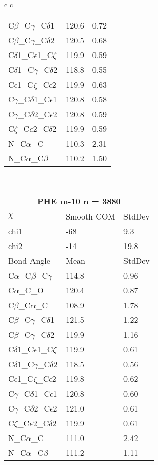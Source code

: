 \begin{longtable}{ c c }
\begin{tabular}{ l l l }
  C$\beta$\_C$\gamma$\_C$\delta$1 & 120.6 & 0.72\\
  C$\beta$\_C$\gamma$\_C$\delta$2 & 120.5 & 0.68\\
  C$\delta$1\_C$\epsilon$1\_C$\zeta$ & 119.9 & 0.59\\
  C$\delta$1\_C$\gamma$\_C$\delta$2 & 118.8 & 0.55\\
  C$\epsilon$1\_C$\zeta$\_C$\epsilon$2 & 119.9 & 0.63\\
  C$\gamma$\_C$\delta$1\_C$\epsilon$1 & 120.8 & 0.58\\
  C$\gamma$\_C$\delta$2\_C$\epsilon$2 & 120.8 & 0.59\\
  C$\zeta$\_C$\epsilon$2\_C$\delta$2 & 119.9 & 0.59\\
  N\_C$\alpha$\_C & 110.3 & 2.31\\
  N\_C$\alpha$\_C$\beta$ & 110.2 & 1.50\\
  \bottomrule
  \end{tabular}
  \\
  \begin{tabular}{ l l l }
  \toprule
  \multicolumn{3}{c}{PHE \textbf{m-10} n = 3880} \\ \toprule
  $\chi$       & Smooth COM & StdDev \\ \midrule
  chi1 & -68 & 9.3 \\ 
  chi2 & -14 & 19.8 \\ \midrule
  Bond Angle   & Mean     & StdDev \\ \midrule
  C$\alpha$\_C$\beta$\_C$\gamma$ & 114.8 & 0.96\\
  C$\alpha$\_C\_O & 120.4 & 0.87\\
  C$\beta$\_C$\alpha$\_C & 108.9 & 1.78\\
  C$\beta$\_C$\gamma$\_C$\delta$1 & 121.5 & 1.22\\
  C$\beta$\_C$\gamma$\_C$\delta$2 & 119.9 & 1.16\\
  C$\delta$1\_C$\epsilon$1\_C$\zeta$ & 119.9 & 0.61\\
  C$\delta$1\_C$\gamma$\_C$\delta$2 & 118.5 & 0.56\\
  C$\epsilon$1\_C$\zeta$\_C$\epsilon$2 & 119.8 & 0.62\\
  C$\gamma$\_C$\delta$1\_C$\epsilon$1 & 120.8 & 0.60\\
  C$\gamma$\_C$\delta$2\_C$\epsilon$2 & 121.0 & 0.61\\
  C$\zeta$\_C$\epsilon$2\_C$\delta$2 & 119.9 & 0.61\\
  N\_C$\alpha$\_C & 111.0 & 2.42\\
  N\_C$\alpha$\_C$\beta$ & 111.2 & 1.11\\

\end{tabular}
\end{longtable}
